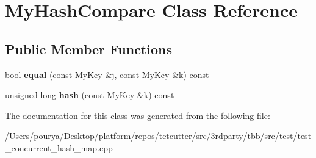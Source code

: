 \hypertarget{classMyHashCompare}{}\section{My\+Hash\+Compare Class Reference}
\label{classMyHashCompare}
\subsection*{Public Member Functions}
\begin{DoxyCompactItemize}
\item 
\hypertarget{classMyHashCompare_ae1ecb22f7417c356db70d5d2a0525cba}{}bool {\bfseries equal} (const \hyperlink{classMyKey}{My\+Key} \&j, const \hyperlink{classMyKey}{My\+Key} \&k) const \label{classMyHashCompare_ae1ecb22f7417c356db70d5d2a0525cba}

\item 
\hypertarget{classMyHashCompare_a346c5a7ca30680ffe16f2f51887e597a}{}unsigned long {\bfseries hash} (const \hyperlink{classMyKey}{My\+Key} \&k) const \label{classMyHashCompare_a346c5a7ca30680ffe16f2f51887e597a}

\end{DoxyCompactItemize}


The documentation for this class was generated from the following file\+:\begin{DoxyCompactItemize}
\item 
/\+Users/pourya/\+Desktop/platform/repos/tetcutter/src/3rdparty/tbb/src/test/test\+\_\+concurrent\+\_\+hash\+\_\+map.\+cpp\end{DoxyCompactItemize}
